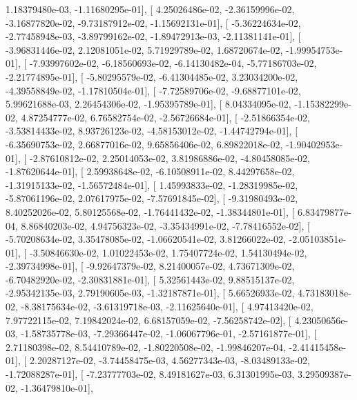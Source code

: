 \documentclass{article}
\begin{document}
          1.18379480e-03,  -1.11680295e-01],
       [  4.25026486e-02,  -2.36159996e-02,  -3.16877820e-02,
         -9.73187912e-02,  -1.15692131e-01],
       [ -5.36224634e-02,  -2.77458948e-03,  -3.89799162e-02,
         -1.89472913e-03,  -2.11381141e-01],
       [ -3.96831446e-02,   2.12081051e-02,   5.71929789e-02,
          1.68720674e-02,  -1.99954753e-01],
       [ -7.93997602e-02,  -6.18560693e-02,  -6.14130482e-04,
         -5.77186703e-02,  -2.21774895e-01],
       [ -5.80295579e-02,  -6.41304485e-02,   3.23034200e-02,
         -4.39558849e-02,  -1.17810504e-01],
       [ -7.72589706e-02,  -9.68877101e-02,   5.99621688e-03,
          2.26454306e-02,  -1.95395789e-01],
       [  8.04334095e-02,  -1.15382299e-02,   4.87254777e-02,
          6.76582754e-02,  -2.56726684e-01],
       [ -2.51866354e-02,  -3.53814433e-02,   8.93726123e-02,
         -4.58153012e-02,  -1.44742794e-01],
       [ -6.35690753e-02,   2.66877016e-02,   9.65856406e-02,
          6.89822018e-02,  -1.90402953e-01],
       [ -2.87610812e-02,   2.25014053e-02,   3.81986886e-02,
         -4.80458085e-02,  -1.87620644e-01],
       [  2.59938648e-02,  -6.10508911e-02,   8.44297658e-02,
         -1.31915133e-02,  -1.56572484e-01],
       [  1.45993833e-02,  -1.28319985e-02,  -5.87061196e-02,
          2.07617975e-02,  -7.57691845e-02],
       [ -9.31980493e-02,   8.40252026e-02,   5.80125568e-02,
         -1.76441432e-02,  -1.38344801e-01],
       [  6.83479877e-04,   8.86840203e-02,   4.94756323e-02,
         -3.35434991e-02,  -7.78416552e-02],
       [ -5.70208634e-02,   3.35478085e-02,  -1.06620541e-02,
          3.81266022e-02,  -2.05103851e-01],
       [ -3.50846630e-02,   1.01022453e-02,   1.75407724e-02,
          1.54130494e-02,  -2.39734998e-01],
       [ -9.92647379e-02,   8.21400057e-02,   4.73671309e-02,
         -6.70482920e-02,  -2.30831881e-01],
       [  5.32561443e-02,   9.88515137e-02,  -2.95342135e-03,
          2.79190605e-03,  -1.32187871e-01],
       [  5.66526933e-02,   4.73183018e-02,  -8.38175634e-02,
         -3.61319718e-03,  -2.11625640e-01],
       [  4.97413420e-02,   7.97722115e-02,   7.19842024e-02,
          6.68157059e-02,  -7.56258742e-02],
       [  4.23050656e-03,  -1.58735778e-03,  -7.29366447e-02,
         -1.06067796e-01,  -2.57161877e-01],
       [  2.71180398e-02,   8.54410789e-02,  -1.80220508e-02,
         -1.99846207e-04,  -2.41415458e-01],
       [  2.20287127e-02,  -3.74458475e-03,   4.56277343e-03,
         -8.03489133e-02,  -1.72088287e-01],
       [ -7.23777703e-02,   8.49181627e-03,   6.31301995e-03,
          3.29509387e-02,  -1.36479810e-01],
\end{document}

